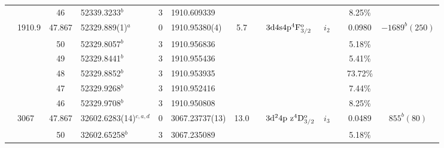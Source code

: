 \begin{table*}
\begin{center}
{\begin{tabular}{:l;l;c;l;c;l;c;l;l;c;c;c;c}
\rowstyle{\itshape}               &        & 46        & 52339.3233$^{b}$                 & 3 &   1910.609339      &      & $                                        $ & $                                        $ & $      $ &              & 8.25\%    & $     ^{}     $\\
                                  & 1910.9 & 47.867    & 52329.889(1)$^{a}$               & 0 &    1910.95380(4)   &  5.7 & $                                        $ & $3\rm{d}4\rm{s}4\rm{p}^4\rm{F}_{3/2}^{\rm o}$ & $i_{2} $ &              & 0.0980    & $-1689^{b}(250)$\\
\rowstyle{\itshape}               &        & 50        & 52329.8057$^{b}$                 & 3 &   1910.956836      &      & $                                        $ & $                                        $ & $      $ &              & 5.18\%    & $     ^{}     $\\
\rowstyle{\itshape}               &        & 49        & 52329.8441$^{b}$                 & 3 &   1910.955436      &      & $                                        $ & $                                        $ & $      $ &              & 5.41\%    & $     ^{}     $\\
\rowstyle{\itshape}               &        & 48        & 52329.8852$^{b}$                 & 3 &   1910.953935      &      & $                                        $ & $                                        $ & $      $ &              & 73.72\%   & $     ^{}     $\\
\rowstyle{\itshape}               &        & 47        & 52329.9268$^{b}$                 & 3 &   1910.952416      &      & $                                        $ & $                                        $ & $      $ &              & 7.44\%    & $     ^{}     $\\
\rowstyle{\itshape}               &        & 46        & 52329.9708$^{b}$                 & 3 &   1910.950808      &      & $                                        $ & $                                        $ & $      $ &              & 8.25\%    & $     ^{}     $\\
                                  & 3067   & 47.867    & 32602.6283(14)$^{c,a,d}$         & 0 &    3067.23737(13)  & 13.0 & $                                        $ & $3\rm{d}^24\rm{p~z}^4\rm{D}_{3/2}^{\rm o}$ & $i_{3} $ &              & 0.0489    & $  855^{b}(80) $\\
\rowstyle{\itshape}               &        & 50        & 32602.65258$^{b}$                & 3 &   3067.235089      &      & $                                        $ & $                                        $ & $      $ &              & 5.18\%    & $     ^{}     $\\

\end{tabular}}
\end{center}
\end{table*}
